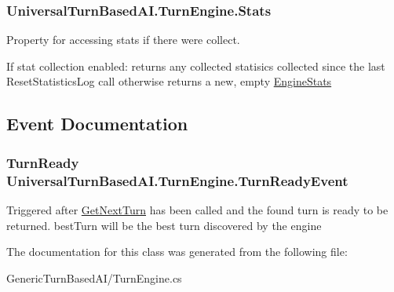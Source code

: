 \subsubsection[{Stats}]{ Universal\+Turn\+Based\+A\+I.\+Turn\+Engine.\+Stats\hspace{0.3cm}{\ttfamily [get]}}\label{class_universal_turn_based_a_i_1_1_turn_engine_a2588f0e4a11f2c96613e72c890e39138}


Property for accessing stats if there were collect. 

If stat collection enabled\+: returns any collected statisics collected since the last Reset\+Statistics\+Log call otherwise returns a new, empty \hyperlink{class_universal_turn_based_a_i_1_1_engine_stats}{Engine\+Stats}

\subsection{Event Documentation}
\hypertarget{class_universal_turn_based_a_i_1_1_turn_engine_af10115494121382d2966a8fc9fe4c9a0}{}
\subsubsection[{Turn\+Ready\+Event}]{\setlength{\rightskip}{0pt plus 5cm}Turn\+Ready Universal\+Turn\+Based\+A\+I.\+Turn\+Engine.\+Turn\+Ready\+Event}\label{class_universal_turn_based_a_i_1_1_turn_engine_af10115494121382d2966a8fc9fe4c9a0}


Triggered after \hyperlink{class_universal_turn_based_a_i_1_1_turn_engine_ae2a5b877b8194f05dc970226722515ee}{Get\+Next\+Turn} has been called and the found turn is ready to be returned. best\+Turn will be the best turn discovered by the engine 



The documentation for this class was generated from the following file\+:\begin{DoxyCompactItemize}
\item 
Generic\+Turn\+Based\+A\+I/Turn\+Engine.\+cs\end{DoxyCompactItemize}
